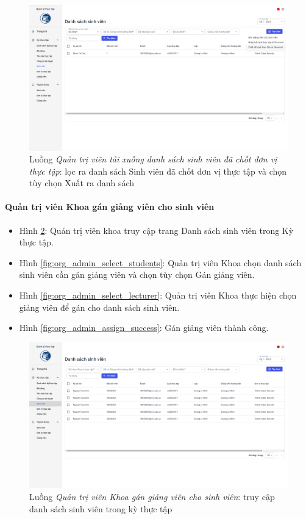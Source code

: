 \documentclass[./../main.tex]{subfiles}
\begin{document}
\begin{figure}[]
	\includegraphics[width=\linewidth]{./images/image74.png}
	\caption{Luồng \emph{Quản trị viên tải xuống danh sách sinh viên đã chốt đơn vị thực tập}: lọc ra danh sách Sinh viên đã chốt đơn vị thực tập và chọn tùy chọn Xuất ra danh sách}
	\label{fig:org_admin_filter_students}
\end{figure}

\paragraph*{Quản trị viên Khoa gán giảng viên cho sinh viên}

\begin{itemize}
	\item Hình \ref{fig:org_admin_access_list_intern_students_1}: Quản trị viên khoa truy cập trang Danh sách sinh viên trong Kỳ thực tập.
	\item Hình \ref{fig:org_admin_select_students}: Quản trị viên Khoa chọn danh sách sinh viên cần gán giảng viên và chọn tùy chọn Gán giảng viên.
	\item Hình \ref{fig:org_admin_select_lecturer}: Quản trị viên Khoa thực hiện chọn giảng viên để gán cho danh sách sinh viên.
	\item Hình \ref{fig:org_admin_assign_success}: Gán giảng viên thành công.
\end{itemize}

\begin{figure}[]
	\includegraphics[width=\linewidth]{./images/image75.png}
	\caption{Luồng \emph{Quản trị viên Khoa gán giảng viên cho sinh viên}: truy cập danh sách sinh viên trong kỳ thực tập}
	\label{fig:org_admin_access_list_intern_students_1}
\end{figure}
\end{document}
